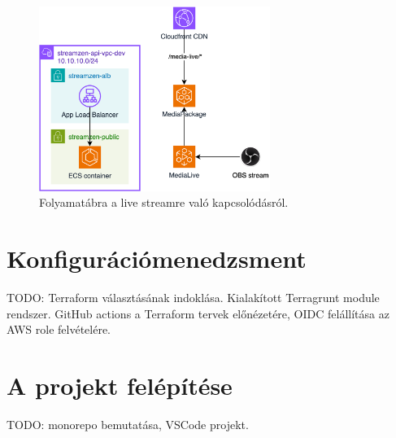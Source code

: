 \begin{figure}[ht]
	\centering
	\includegraphics[height=60mm, keepaspectratio]{figures/dipterv_live2.png}
	\caption{Folyamatábra a live streamre való kapcsolódásról.}
	\label{fig:live2}
\end{figure}

\section{Konfigurációmenedzsment}

TODO: Terraform választásának indoklása. Kialakított Terragrunt module rendszer. GitHub actions a Terraform tervek előnézetére, OIDC felállítása az AWS role felvételére.

\section{A projekt felépítése}

TODO: monorepo bemutatása, VSCode projekt.
